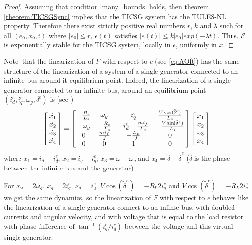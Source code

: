 \documentclass[letterpaper,10pt,conference]{ieeeconf}
\renewcommand{\l}    {{\lambda}}
\renewcommand{\o}    {{\omega}}
\newcommand{\nm}     {{\hbox{\hskip -3pt}}}
\newcommand{\Emscr}  {{\mathcal{E}}}
\begin{document}
\begin{proof}
Assuming that condition \ref{many_bounds} holds, then theorem
\ref{theorem:TICSGSync} implies that the TICSG system has the TULES-NL
property. Therefore there exist strictly positive real numbers $r$,
$k$ and $\l$ such for all $(e_0,x_0,t)$ where $\left| e_0 \right|
\leq r$, $e(t)$ satisfies $\left|e(t)\right|\leq k\left|e_0\right|
exp(-\l t)$. Thus, $\Emscr$ is exponentially stable for the TICSG 
system, locally in $e$, uniformly in $x$.
\end{proof}

Note, that the linearization of $F$ with respect to $e$ (see
\eqref{eq:AOft}) has the same structure of the linearization of a
system of a single generator connected to an infinite bus around it
equilibrium point. Indeed, the linearization of a single generator
connected to an infinite bus, around an equilibrium point
$(i^e_d,i^e_q,\o_g, \delta^e)$ is (see \cite[formula (3.4)]{NaWe:15})
$$ \left[\nm\begin{array}{c} \dot{x_1} \\ \dot{x_2 }\\ \dot{x_3} \\
   \dot{x_4} \end{array}\nm\right]=\left[\nm\begin{array}{cccc}
   -\frac{R_s}{L_s} & \omega_g & i_q^e & \frac{V\cos(\tilde
   {\delta}^e)}{L_s}\\ -\o_g & -\frac{R_s}{L_s} & -i_d^e-\frac{mi_f}
   {L_s} & -\frac{V\sin(\tilde{\delta}^e)}{L_s}\\ 0 & \frac{mi_{f}}
   {J} & -\frac{D_{p}}{J} & 0\\ 0 & 0 & 1 & 0 \end{array}\nm\right]  
   \left[\nm\begin{array}{c} x_1 \\ x_2 \\ x_3 \\ x_4
   \end{array}\nm\right]$$
where $x_1 = i_d-i^e_d$, $x_2 = i_q-i_q^e$, $x_3=\o-\o_g$ and
$x_4= \tilde{\delta} - \tilde{\delta}^e$ ($\tilde{\delta}$ is the
phase between the infinite bus and the generator).

For $x_\o=2\o_g$, $x_q=2 i_q^e$, $x_d=i_d^e$, $V\cos(\tilde{\delta}^e)
= -R_L 2 i_q^e$ and $V \cos(\tilde{\delta}^e) = -R_L 2 i_q^e$ we get
the same dynamics, so the linearization of $F$ with respect to $e$
behaves like the linearization of a single generator connect to an
infinte bus, with doubled currents and angular velocity, and with
voltage that is equal to the load resistor with phase difference of
$\tan^{-1}\left(i_q^e / i_d^e\right)$ between the voltage and this
virtual single generator.
\end{document}
